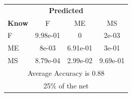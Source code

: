 \documentclass[12pt]{article} %
\begin{document}
\begin{minipage}{0.5\textwidth}
\begin{center}
\begin{tabular}{l|c|c|c|}
 \multicolumn{4}{c}{ \textbf{ Predicted}}\\
 \textbf{Know}&F&ME&MS\\ \hline\hline
F   &9.98e-01&0&2e-03\\
ME &8e-03&6.91e-01&3e-01\\
MS &8.79e-04&2.99e-02&9.69e-01\\
\multicolumn{4}{c}{Average Accuracy is 0.88}\\
\multicolumn{4}{c}{25\%  of the net}\\
\end{tabular}
\end{center}
\end{minipage}
\end{document}

